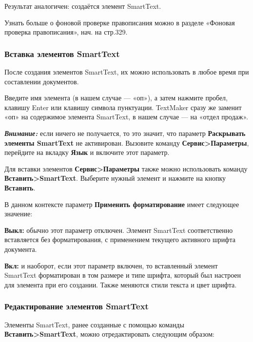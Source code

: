 ﻿\documentclass[a4paper,10pt]{article}
\begin{document}
Результат аналогичен: создаётся элемент SmartText.

Узнать больше о фоновой проверке правописания можно в разделе «Фоновая проверка правописания», нач. на стр.329.

\subsubsection{Вставка элементов SmartText}
После создания элементов SmartText, их можно использовать в любое время при составлении документов. 

Введите имя элемента (в нашем случае — «оп»), а затем нажмите пробел, клавишу Enter или клавишу символа пунктуации. TextMaker сразу же заменит «оп» на содержимое элемента SmartText, в нашем случае — на «отдел продаж».

\begin{mdframed}[backgroundcolor=blue!10]
\textbf{\textit{Внимание:}} если ничего не получается, то это значит, что параметр \textbf{Раскрывать элементы SmartText} не активирован. Вызовите команду \textbf{Сервис>Параметры}, перейдите на вкладку \textbf{Язык} и включите этот параметр.
\end{mdframed}

Для вставки элементов \textbf{Сервис>Параметры} также можно использовать команду \textbf{Вставить>SmartText}. Выберите нужный элемент и нажмите на кнопку \textbf{Вставить}.

В данном контексте параметр \textbf{Применить форматирование} имеет следующее значение:

\textbf{Выкл:} обычно этот параметр отключен. Элемент SmartText соответственно вставляется без форматирования, с применением текущего активного шрифта документа.

\textbf{Вкл:} и наоборот, если этот параметр включен, то вставленный элемент SmartText форматирован в том размере и типе шрифта, который был настроен для элемента при его создании. Также меняются стили текста и цвет шрифта.

\subsubsection{Редактирование элементов SmartText}
Элементы SmartText, ранее созданные с помощью команды \textbf{Вставить>SmartText}, можно отредактировать следующим образом:
\end{document}

